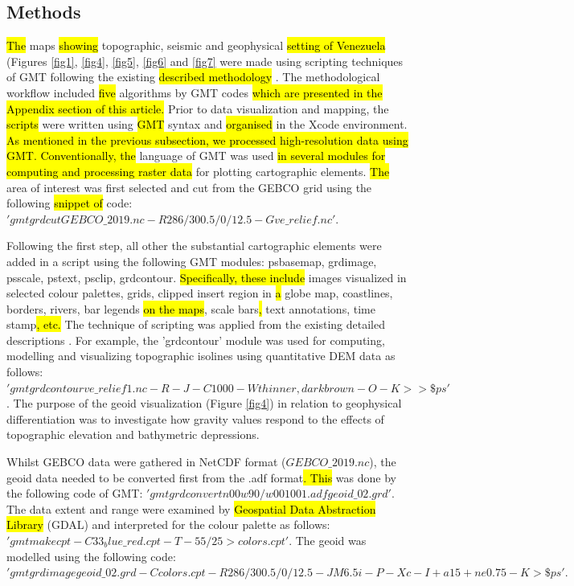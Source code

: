 \documentclass[sustainability,article,submit,pdftex,moreauthors]{Definitions/mdpi}
\begin{document}
\subsection{Methods}
\hl{The }maps \hl{showing }topographic, seismic and geophysical \hl{setting of Venezuela }(Figures \ref{fig1}, \ref{fig4}, \ref{fig5}, \ref{fig6} and \ref{fig7} were made using scripting techniques\hl{ }of\hl{ }GMT \cite{Wessel} following the existing \hl{described methodology }\citep{Lemenkova2022b,Lemenkova202217}. The methodological workflow included \hl{five }algorithms by GMT codes \hl{which are presented in the Appendix section of this article.} Prior to data visualization and mapping, the\hl{ scripts }were written using \hl{GMT} syntax and \hl{organised }in the Xcode environment. \hl{As mentioned in the previous subsection, we processed high-resolution data using GMT. Conventionally, the }language of GMT was used \hl{in several modules for computing and processing raster data }for plotting\hl{ }cartographic elements. \hl{The} area of interest was first selected and cut from the GEBCO grid using the following \hl{snippet of }code: $'gmt grdcut GEBCO\_2019.nc -R286/300.5/0/12.5 -Gve\_relief.nc'.$

Following the first step, all other the substantial cartographic elements\hl{ }were added in a script using the following GMT modules: psbasemap, grdimage, psscale, pstext, psclip, grdcontour. \hl{Specifically, these include} images visualized in selected colour palettes, grids, clipped insert region\hl{ }in\hl{ a }globe map, coastlines, borders, rivers, bar legends \hl{on the maps}, scale bars\hl{, }text annotations, time stamp\hl{, etc. }The technique of scripting was applied from the existing detailed descriptions \cite{Lemenkova2021b}. For example, the 'grdcontour' module was used for computing, modelling and visualizing topographic isolines using quantitative DEM data as follows: $'gmt grdcontour ve\_relief1.nc -R -J -C1000 -Wthinner,darkbrown -O -K >> \$ps'$. The purpose of the geoid visualization (Figure \ref{fig4}) in relation to geophysical differentiation was to investigate how gravity values respond to the effects of topographic elevation and bathymetric depressions. 

Whilst GEBCO data were gathered in NetCDF format ($GEBCO\_2019.nc$), the geoid data needed to be converted first from the .adf format\hl{. This }was done by the following code of GMT: $'gmt grdconvert n00w90/w001001.adf geoid\_02.grd'.$ The data extent and range were examined by \hl{Geospatial Data Abstraction Library }(GDAL) and interpreted for the colour palette as follows: $'gmt makecpt -C33_blue\_red.cpt -T-55/25 > colors.cpt'.$ The geoid was modelled using the following code: $'gmt grdimage geoid\_02.grd -Ccolors.cpt -R286/300.5/0/12.5 -JM6.5i -P -Xc -I+a15+ne0.75 -K > \$ps'.$
\end{document}
